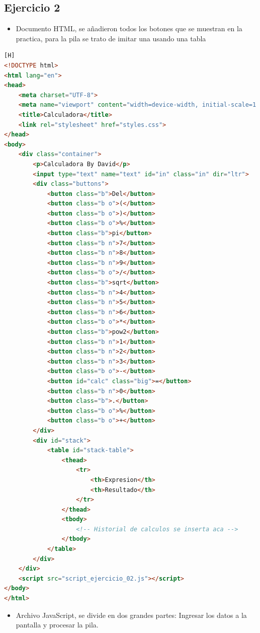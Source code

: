 \documentclass{article}
\begin{document}
		\subsection{Ejercicio 2}
	\begin{itemize}	
		\item Documento HTML, se añadieron todos los botones que se muestran en la practica, para la pila se trato de imitar una usando una tabla
	\end{itemize}	
		
	\begin{lstlisting}[language=html,caption={Ejercicio2/index.html}][H]
<!DOCTYPE html>
<html lang="en">
<head>
    <meta charset="UTF-8">
    <meta name="viewport" content="width=device-width, initial-scale=1.0">
    <title>Calculadora</title>
    <link rel="stylesheet" href="styles.css">
</head>
<body>
    <div class="container">
        <p>Calculadora By David</p>
        <input type="text" name="text" id="in" class="in" dir="ltr">
        <div class="buttons">
            <button class="b">Del</button>
            <button class="b o">(</button>
            <button class="b o">)</button>
            <button class="b o">%</button>
            <button class="b">pi</button>
            <button class="b n">7</button>
            <button class="b n">8</button>
            <button class="b n">9</button>
            <button class="b o">/</button>
            <button class="b">sqrt</button>
            <button class="b n">4</button>
            <button class="b n">5</button>
            <button class="b n">6</button>
            <button class="b o">*</button>
            <button class="b">pow2</button>
            <button class="b n">1</button>
            <button class="b n">2</button>
            <button class="b n">3</button>
            <button class="b o">-</button>
            <button id="calc" class="big">=</button>
            <button class="b n">0</button>
            <button class="b">.</button>
            <button class="b o">%</button>
            <button class="b o">+</button>
        </div>
        <div id="stack">
            <table id="stack-table">
                <thead>
                    <tr>
                        <th>Expresion</th>
                        <th>Resultado</th>
                    </tr>
                </thead>
                <tbody>
                    <!-- Historial de calculos se inserta aca -->
                </tbody>
            </table>
        </div>
    </div>
    <script src="script_ejercicio_02.js"></script>
</body>
</html>
	\end{lstlisting}
\begin{itemize}	
		\item Archivo JavaScript, se divide en dos grandes partes: Ingresar los datos a la pantalla y procesar la pila.
	\end{itemize}	
		
\end{document}

